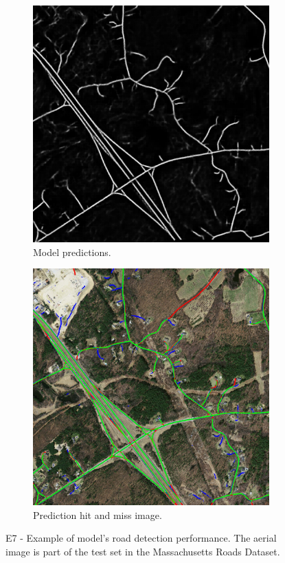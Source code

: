 \begin{figure}
\begin{subfigure}{0.48\textwidth}
\includegraphics[width=\textwidth]{figs/E7/E7-pred.jpg}
\caption{Model predictions.} \label{fig:E7_model_predictions}
\end{subfigure}
\hspace*{\fill} %
\begin{subfigure}{0.48\textwidth}
\includegraphics[width=\textwidth]{figs/E7/E7-hit.jpg}
\caption{Prediction hit and miss image.} \label{fig:E7_hit_image}
\end{subfigure}
\caption[E7 - Qualitiative results of the road extraction system ]{E7 - Example of model's road detection performance. The aerial image is part of the test set in the Massachusetts Roads Dataset.} \label{fig:E7_performance}
\end{figure}

